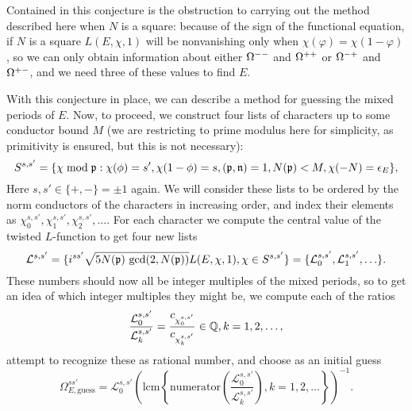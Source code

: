 \documentclass{amsart}
\newcommand{\n}{\mathfrak{n}}
\begin{document}
\begin{remark}
Contained in this conjecture is the obstruction to carrying out the method described here when 
$N$ is a square: because of the sign of the functional equation, if $N$ is a square $L(E, \chi, 1)$
will be nonvanishing only when $\chi(\varphi) = \chi(1 - \varphi)$, so we can only obtain
information about either $\Omega^{--}$ and $\Omega^{++}$ or $\Omega^{-+}$ and $\Omega^{+-}$, and we need
three of these values to find $E$.
\end{remark}

With this conjecture in place, we can describe a method for guessing the mixed periods of
$E$.
Now, to proceed, we construct four lists of characters
up to some conductor bound $M$ (we are restricting to prime modulus here for simplicity,
as primitivity is ensured, but this is not necessary):
\[
    S^{s,s'} = \{ \chi \bmod \p : \chi(\phi) = s', \chi(1 - \phi) = s,
            (\p, \n) = 1, N(\p) < M, \chi(-N) = \epsilon_E\},
\]
Here $s, s' \in \{+, -\} = \pm 1$ again. We will consider these lists to be ordered by the
norm conductors of the characters in increasing order, and index their elements as
$\chi^{s,s'}_0, \chi^{s,s'}_1, \chi^{s,s'}_2, \ldots$. For each character we compute the central
value of the twisted $L$-function to get four new lists
\[
    \mathcal{L}^{s,s'} = \{ i^{ss'}\sqrt{5 N(\mathfrak{p})\ \mathrm{gcd}(2, N(\mathfrak{p})) } L(E,\chi,1), \chi \in S^{s,s'}\} =
        \{\mathcal{L}^{s,s'}_0, \mathcal{L}^{s,s'}_1, \ldots\}.
\]
These numbers should now all be integer multiples of the mixed periods, so to get an idea
of which integer multiples they might be, we compute each of the ratios 
\[
    \frac{\mathcal{L}^{s,s'}_0}{\mathcal{L}^{s,s'}_k} = \frac{c_{\chi^{s,s'}_0}}{c_{\chi^{s,s'}_k}} \in \mathbb{Q}, k = 1, 2, \ldots,
\]
attempt to recognize these as rational number, and 
choose as an initial guess
\[
    \Omega^{ss'}_{E, \mathrm{guess}} = \mathcal{L}^{s,s'}_0\left(\mathrm{lcm}\left\{ \mathrm{numerator}\left(\frac{\mathcal{L}^{s,s'}_0}{\mathcal{L}^{s,s'}_k}\right), k = 1,2, \ldots \right\}\right)^{-1}.
\]
\end{document}
